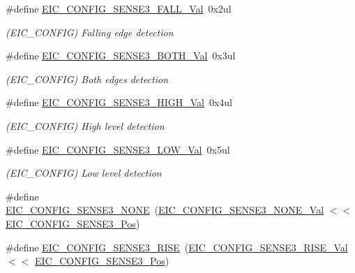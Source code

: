 \begin{DoxyCompactItemize}
\#define \mbox{\hyperlink{group___s_a_m_d21___e_i_c_gaf4c91968458631be4fa57f3c0c15404c}{E\+I\+C\+\_\+\+C\+O\+N\+F\+I\+G\+\_\+\+S\+E\+N\+S\+E3\+\_\+\+F\+A\+L\+L\+\_\+\+Val}}~0x2ul
\begin{DoxyCompactList}\small\item\em (E\+I\+C\+\_\+\+C\+O\+N\+F\+IG) Falling edge detection \end{DoxyCompactList}\item 
\#define \mbox{\hyperlink{group___s_a_m_d21___e_i_c_gaa8713c71e12ac27aed9182636e488bc6}{E\+I\+C\+\_\+\+C\+O\+N\+F\+I\+G\+\_\+\+S\+E\+N\+S\+E3\+\_\+\+B\+O\+T\+H\+\_\+\+Val}}~0x3ul
\begin{DoxyCompactList}\small\item\em (E\+I\+C\+\_\+\+C\+O\+N\+F\+IG) Both edges detection \end{DoxyCompactList}\item 
\#define \mbox{\hyperlink{group___s_a_m_d21___e_i_c_gac73c1ef1256ac37c4a05f3f3437ca87d}{E\+I\+C\+\_\+\+C\+O\+N\+F\+I\+G\+\_\+\+S\+E\+N\+S\+E3\+\_\+\+H\+I\+G\+H\+\_\+\+Val}}~0x4ul
\begin{DoxyCompactList}\small\item\em (E\+I\+C\+\_\+\+C\+O\+N\+F\+IG) High level detection \end{DoxyCompactList}\item 
\#define \mbox{\hyperlink{group___s_a_m_d21___e_i_c_gacd770ca16cc8b9bd76408b1ab7391ff5}{E\+I\+C\+\_\+\+C\+O\+N\+F\+I\+G\+\_\+\+S\+E\+N\+S\+E3\+\_\+\+L\+O\+W\+\_\+\+Val}}~0x5ul
\begin{DoxyCompactList}\small\item\em (E\+I\+C\+\_\+\+C\+O\+N\+F\+IG) Low level detection \end{DoxyCompactList}\item 
\#define \mbox{\hyperlink{group___s_a_m_d21___e_i_c_ga98941a10dd51749042a10b67ed8eb3b2}{E\+I\+C\+\_\+\+C\+O\+N\+F\+I\+G\+\_\+\+S\+E\+N\+S\+E3\+\_\+\+N\+O\+NE}}~(\mbox{\hyperlink{group___s_a_m_d21___e_i_c_gae6cb4f8bb0afd3fd2c89dad8d552ec1f}{E\+I\+C\+\_\+\+C\+O\+N\+F\+I\+G\+\_\+\+S\+E\+N\+S\+E3\+\_\+\+N\+O\+N\+E\+\_\+\+Val}}    $<$$<$ \mbox{\hyperlink{group___s_a_m_d21___e_i_c_ga831aeaf54a89c732e999bddee6ad0cbf}{E\+I\+C\+\_\+\+C\+O\+N\+F\+I\+G\+\_\+\+S\+E\+N\+S\+E3\+\_\+\+Pos}})
\item 
\#define \mbox{\hyperlink{group___s_a_m_d21___e_i_c_ga1ca0923ce75dad191065a40e021b6028}{E\+I\+C\+\_\+\+C\+O\+N\+F\+I\+G\+\_\+\+S\+E\+N\+S\+E3\+\_\+\+R\+I\+SE}}~(\mbox{\hyperlink{group___s_a_m_d21___e_i_c_gae1f57c9ebb1706bb46bc77ef24f56a81}{E\+I\+C\+\_\+\+C\+O\+N\+F\+I\+G\+\_\+\+S\+E\+N\+S\+E3\+\_\+\+R\+I\+S\+E\+\_\+\+Val}}    $<$$<$ \mbox{\hyperlink{group___s_a_m_d21___e_i_c_ga831aeaf54a89c732e999bddee6ad0cbf}{E\+I\+C\+\_\+\+C\+O\+N\+F\+I\+G\+\_\+\+S\+E\+N\+S\+E3\+\_\+\+Pos}})

\end{DoxyCompactItemize}
